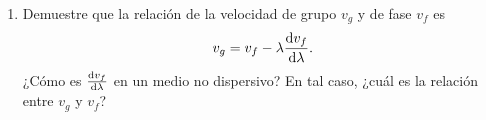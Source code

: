 \documentclass[11pt,spanish,a4paper]{article}
\begin{document}
\begin{enumerate}
\item Demuestre que la relación de la velocidad de grupo $v_g$ y de fase $v_f$ es
$$
v_g = v_f - \lambda \dv{v_f}{\lambda}.
$$
¿Cómo es $\dv{v_f}{\lambda}$ en un medio no dispersivo?
En tal caso, ¿cuál es la relación entre $v_g$ y $v_f$?





\end{enumerate}
\end{document}
